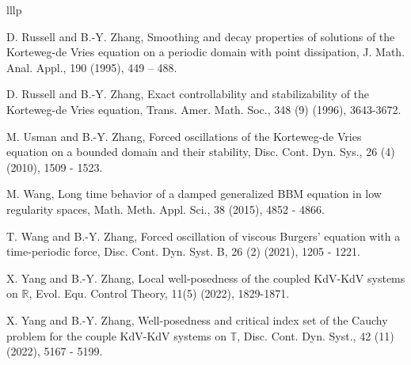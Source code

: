 \documentclass[10pt,a4paper,final]{article}
\numberwithin{equation}{section}
\begin{document}
\begin{thebibliography}{lllp}



 D. Russell and B.-Y. Zhang, Smoothing and decay properties of solutions of the Korteweg-de Vries equation on a periodic domain with point dissipation, J. Math. Anal. Appl., 190 (1995), 449 -- 488.

 D. Russell and B.-Y. Zhang, Exact controllability and stabilizability of the Korteweg-de Vries equation, Trans. Amer. Math. Soc., 348 (9) (1996), 3643-3672. 

 M. Usman and B.-Y. Zhang, Forced oscillations of the Korteweg-de Vries equation on a bounded domain and their stability, Disc. Cont. Dyn. Sys., 26 (4) (2010), 1509 - 1523.

 M. Wang, Long time behavior of a damped generalized BBM equation in low regularity spaces, Math. Meth. Appl. Sci., 38 (2015), 4852 - 4866. 

 T. Wang and B.-Y. Zhang, Forced oscillation of viscous Burgers' equation with a time-periodic force, Disc. Cont. Dyn. Syst. B, 26 (2) (2021), 1205 - 1221.


 X. Yang and B.-Y. Zhang, Local well-posedness of the coupled KdV-KdV systems on $\mathbb{R}$, Evol. Equ. Control Theory, 11(5) (2022), 1829-1871.

 X. Yang and B.-Y. Zhang, Well-posedness and critical index set of the Cauchy problem for the couple KdV-KdV systems on $\mathbb{T}$, Disc. Cont. Dyn. Syst., 42 (11) (2022), 5167 - 5199. 
\end{thebibliography}
\end{document}
